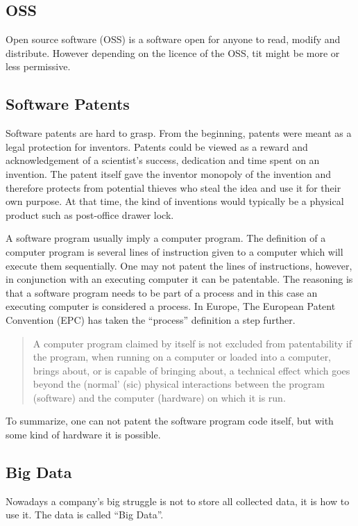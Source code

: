 \documentclass[conference]{IEEEtran}
\begin{document}
\subsection{OSS}
Open source software (OSS) is a software open for anyone to read, modify and distribute. However depending on the licence of the OSS, tit might be more or less permissive. \cite{OSS}

\subsection{Software Patents}
Software patents are hard to grasp. From the beginning, patents were meant as a legal protection for inventors. Patents could be viewed as a reward and acknowledgement of a scientist's success, dedication and time spent on an invention. The patent itself gave the inventor monopoly of the invention and therefore protects from potential thieves who steal the idea and use it for their own purpose. \cite{SoftwarePatent} At that time, the kind of inventions would typically be a physical product such as post-office drawer lock.\cite{LockPatent}

A software program usually imply a computer program. The definition of a computer program is several lines of instruction given to a computer which will execute them sequentially. One may not patent the lines of instructions, however, in conjunction with an executing computer it can be patentable. The reasoning is that a software program needs to be part of a process and in this case an executing computer is considered a process. In Europe, The European Patent Convention (EPC) has taken the ``process'' definition a step further. \cite{SoftwarePatent}
\begin{quotation}
A computer program claimed by itself is not excluded from patentability if the program, when running on a computer or loaded into a computer, brings about, or is capable of bringing about, a technical effect which goes beyond the (normal' (sic) physical interactions between the program (software) and the computer (hardware) on which it is run. \cite[p. 36]{SoftwarePatent}
\end{quotation} 

To summarize, one can not patent the software program code itself, but with some kind of hardware it is possible.
\subsection{Big Data}
Nowadays a company's big struggle is not to store all collected data, it is how to use it. The data is called ``Big Data''. \cite{ExploitBigData}
\end{document}
